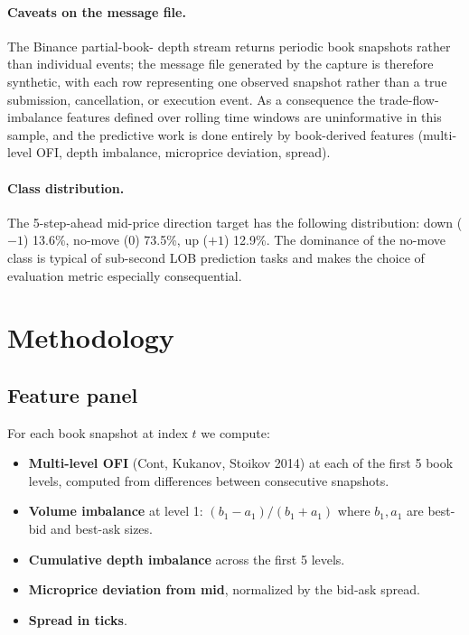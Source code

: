 \documentclass[11pt]{article}
\begin{document}
\paragraph{Caveats on the message file.} The Binance partial-book-
depth stream returns periodic book snapshots rather than individual
events; the message file generated by the capture is therefore
synthetic, with each row representing one observed snapshot rather
than a true submission, cancellation, or execution event. As a
consequence the trade-flow-imbalance features defined over rolling
time windows are uninformative in this sample, and the predictive
work is done entirely by book-derived features (multi-level OFI,
depth imbalance, microprice deviation, spread).

\paragraph{Class distribution.} The 5-step-ahead mid-price direction
target has the following distribution: down (\(-1\)) 13.6\%,
no-move (\(0\)) 73.5\%, up (\(+1\)) 12.9\%. The dominance of the
no-move class is typical of sub-second LOB prediction tasks and
makes the choice of evaluation metric especially consequential.

\section{Methodology}
\label{sec:method}

\subsection{Feature panel}

For each book snapshot at index \(t\) we compute:

\begin{itemize}
\item \textbf{Multi-level OFI} (Cont, Kukanov, Stoikov 2014) at each of
  the first 5 book levels, computed from differences between
  consecutive snapshots.
\item \textbf{Volume imbalance} at level 1: \((b_1 - a_1)/(b_1 + a_1)\)
  where \(b_1, a_1\) are best-bid and best-ask sizes.
\item \textbf{Cumulative depth imbalance} across the first 5 levels.
\item \textbf{Microprice deviation from mid}, normalized by the
  bid-ask spread.
\item \textbf{Spread in ticks}.
\end{itemize}
\end{document}
